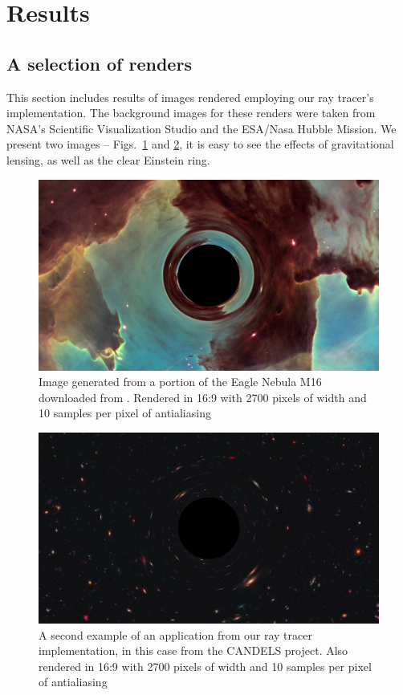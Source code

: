 \section{Results}
\label{sec:results}

\subsection{A selection of renders}

This section includes results of images rendered employing our ray tracer's implementation.
The background images for these renders were taken from NASA's Scientific Visualization Studio and the ESA/Nasa Hubble Mission.
We present two images -- Figs.~\ref{fig:eagle} and \ref{fig:starry}, it is easy to see the effects of gravitational lensing, as well as the clear Einstein ring. 

\begin{figure}[h]
  \centering
  \includegraphics[width=0.8\linewidth]{figs/eagle_render}
  \caption{Image generated from a portion of the Eagle Nebula M16 downloaded from \cite{esa-pillars}. Rendered in 16:9 with 2700 pixels of width and 10 samples per pixel of antialiasing}
  \label{fig:eagle}
\end{figure}


\begin{figure}[h]
  \centering
  \includegraphics[width=0.8\linewidth]{figs/starry_render}
  \caption{A second example of an application from our ray tracer implementation,
	in this case from the CANDELS project\cite{candels-nasa_svs}. Also rendered in 16:9 with 2700 pixels of width and 10 samples per pixel of antialiasing}
  \label{fig:starry}
\end{figure}




